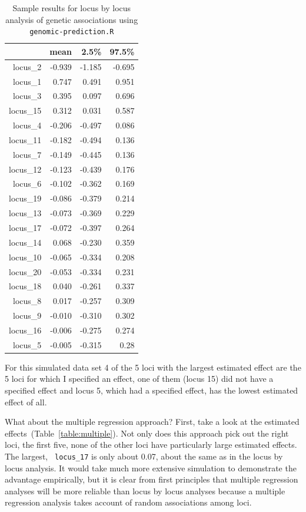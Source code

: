 \documentclass[12pt]{article}
\begin{document}
\begin{table}
  \centering
\begin{tabular}{rrrr}
  \hline
 & mean & 2.5\% & 97.5\% \\ 
  \hline
locus\_2  & -0.939 & -1.185 & -0.695 \\
locus\_1  & 0.747  & 0.491  & 0.951 \\
locus\_3  & 0.395  & 0.097  & 0.696 \\
locus\_15 & 0.312  & 0.031  & 0.587 \\
locus\_4  & -0.206 & -0.497 & 0.086 \\
locus\_11 & -0.182 & -0.494 & 0.136 \\
locus\_7  & -0.149 & -0.445 & 0.136 \\
locus\_12 & -0.123 & -0.439 & 0.176 \\
locus\_6  & -0.102 & -0.362 & 0.169 \\
locus\_19 & -0.086 & -0.379 & 0.214 \\
locus\_13 & -0.073 & -0.369 & 0.229 \\
locus\_17 & -0.072 & -0.397 & 0.264 \\
locus\_14 & 0.068  & -0.230 & 0.359 \\
locus\_10 & -0.065 & -0.334 & 0.208 \\
locus\_20 & -0.053 & -0.334 & 0.231 \\
locus\_18 & 0.040  & -0.261 & 0.337 \\
locus\_8  & 0.017  & -0.257 & 0.309 \\
locus\_9  & -0.010 & -0.310 & 0.302 \\
locus\_16 & -0.006 & -0.275 & 0.274 \\
locus\_5  & -0.005 & -0.315 & 0.28 \\
  \hline
\end{tabular}
\caption{Sample results for locus by locus analysis of genetic
  associations using {\tt genomic-prediction.R}}\label{table:single}
\end{table}

For this simulated data set 4 of the 5 loci with the largest estimated
effect are the 5 loci for which I specified an effect, one of them
(locus 15) did not have a specified effect and locus 5, which had a
specified effect, has the lowest estimated effect of all. 

What about the multiple regression approach? First, take a look at the
estimated effects~(Table~\ref{table:multiple}). Not only does this
approach pick out the right loci, the first five, none of the other
loci have particularly large estimated effects. The largest, {\tt
  locus\_17} is only about 0.07, about the same as in the locus by
locus analysis. It would take much more extensive simulation to
demonstrate the advantage empirically, but it is clear from first
principles that multiple regression analyses will be more reliable
than locus by locus analyses because a multiple regression analysis
takes account of random associations among loci.
\end{document}
